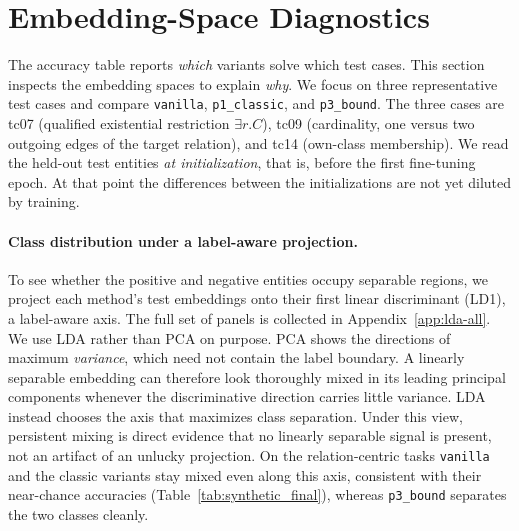 \documentclass[a4paper,oneside,bibliography=totoc]{scrbook}
\begin{document}



\section{Embedding-Space Diagnostics}
\label{sec:results_diagnostics}

The accuracy table reports \emph{which} variants solve which test cases. This
section inspects the embedding spaces to explain \emph{why}. We focus on three
representative test cases and compare \texttt{vanilla}, \texttt{p1\_classic}, and
\texttt{p3\_bound}. The three cases are tc07 (qualified existential restriction
$\exists r.C$), tc09 (cardinality, one versus two outgoing edges of the target
relation), and tc14 (own-class membership). We read the held-out test entities
\emph{at initialization}, that is, before the first fine-tuning epoch. At that
point the differences between the initializations are not yet diluted by
training. 

\paragraph{Class distribution under a label-aware projection.}
To see whether the positive and negative entities occupy separable regions, we
project each method's test embeddings onto their first linear discriminant (LD1),
a label-aware axis. The full set of panels is collected in
Appendix~\ref{app:lda-all}. We use LDA rather than PCA on purpose. PCA shows the
directions of maximum \emph{variance}, which need not contain the label boundary.
A linearly separable embedding can therefore look thoroughly mixed in its leading
principal components whenever the discriminative direction carries little
variance. LDA instead chooses the axis that maximizes class separation. Under
this view, persistent mixing is direct evidence that no linearly separable signal
is present, not an artifact of an unlucky projection. On the relation-centric
tasks \texttt{vanilla} and the classic variants stay mixed even along this axis,
consistent with their near-chance accuracies (Table~\ref{tab:synthetic_final}),
whereas \texttt{p3\_bound} separates the two classes cleanly.
\end{document}
